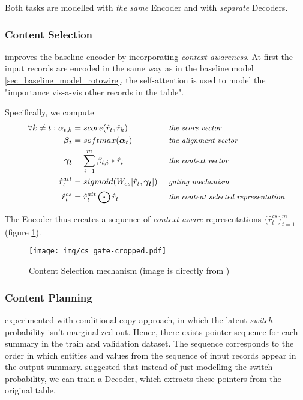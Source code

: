 Both tasks are modelled with \emph{the same} Encoder and with \emph{separate} Decoders.

\subsubsection{Content Selection}

\citep{puduppully2019datatotext} improves the baseline encoder by incorporating \emph{context awareness}. At first the input records are encoded in the same way as in the baseline model \ref{sec_baseline_model_rotowire}, the self-attention is used to model the "importance vis-a-vis other records in the table".

Specifically, we compute
\begin{align*}
\forall k \neq t : \alpha_{t, k} &= score(\hat{r}_t, \hat{r}_k)                         &&\mbox{ \small \emph{the score vector}}\\
\boldsymbol{\beta_t}             &= softmax(\boldsymbol{\alpha_t})                      &&\mbox{ \small \emph{the alignment vector}}\\
\boldsymbol{\gamma_t}            &= \sum_{i=1}^m{\beta_{t, i} * \hat{r}_i}               &&\mbox{ \small \emph{the context vector}}\\
\hat{r}_t^{att}                  &= sigmoid( W_{cs} [\hat{r}_t, \boldsymbol{\gamma_t}] ) &&\mbox{ \small \emph{gating mechanism}}\\
\hat{r}_t^{cs}                   &= \hat{r}_t^{att} \bigodot \hat{r}_t                  &&\mbox{ \small \emph{the content selected representation}}
\end{align*}

The Encoder thus creates a sequence of \emph{context aware} representations $\{\hat{r}_t^{cs}\}_{t=1}^m$ (figure \ref{content_selection_pudupully}).

\begin{figure}[!h]
    \texttt{[image: img/cs\_gate-cropped.pdf]}
    \caption{Content Selection mechanism (image is directly from \citep{puduppully2019datatotext})} \label{content_selection_pudupully}
\end{figure}

\subsubsection{Content Planning}

\citep{wiseman2017} experimented with conditional copy approach, in which the latent \emph{switch} probability isn't marginalized out. Hence, there exists pointer sequence for each summary in the train and validation dataset. The sequence corresponds to the order in which entities and values from the sequence of input records appear in the output summary. \citep{puduppully2019datatotext} suggested that instead of just modelling the switch probability, we can train a Decoder, which extracts these pointers from the original table.

